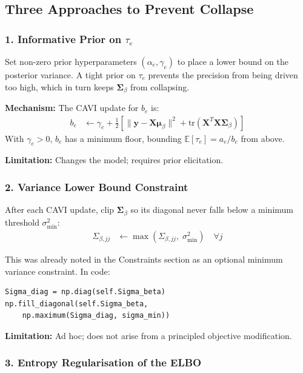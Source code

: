 \documentclass[11pt,a4paper]{article}
\begin{document}
\subsection*{Three Approaches to Prevent Collapse}

\subsubsection*{1. Informative Prior on $\tau_e$}

Set non-zero prior hyperparameters $(\alpha_e, \gamma_e)$ to place a lower bound on the posterior variance. A tight prior on $\tau_e$ prevents the precision from being driven too high, which in turn keeps $\bm{\Sigma}_\beta$ from collapsing.

\textbf{Mechanism:} The CAVI update for $b_e$ is:
\begin{align}
  b_e &\leftarrow \gamma_e + \frac{1}{2}\left[\|\bm{y} - \bm{X}\bm{\mu}_\beta\|^2 + \mathrm{tr}(\bm{X}^T\bm{X}\bm{\Sigma}_\beta)\right]
\end{align}
With $\gamma_e > 0$, $b_e$ has a minimum floor, bounding $\mathbb{E}[\tau_e] = a_e/b_e$ from above.

\textbf{Limitation:} Changes the model; requires prior elicitation.

\subsubsection*{2. Variance Lower Bound Constraint}

After each CAVI update, clip $\bm{\Sigma}_\beta$ so its diagonal never falls below a minimum threshold $\sigma^2_{\min}$:
\begin{align}
  \Sigma_{\beta,jj} &\leftarrow \max\!\left(\Sigma_{\beta,jj},\; \sigma^2_{\min}\right) \quad \forall j
\end{align}

This was already noted in the Constraints section as an optional minimum variance constraint. In code:
\begin{verbatim}
Sigma_diag = np.diag(self.Sigma_beta)
np.fill_diagonal(self.Sigma_beta,
    np.maximum(Sigma_diag, sigma_min))
\end{verbatim}

\textbf{Limitation:} Ad hoc; does not arise from a principled objective modification.

\subsubsection*{3. Entropy Regularisation of the ELBO}
\end{document}
